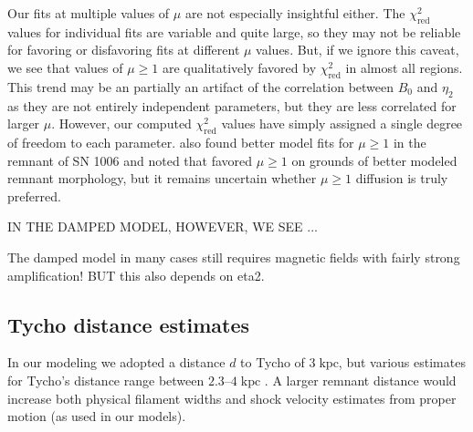 \documentclass[iop, apj, numberedappendix]{emulateapj}
\newcommand*{\mt}{\mathrm}
\newcommand*{\unit}[1]{\;\mt{#1}}  %
\begin{document}
Our fits at multiple values of $\mu$ are not especially insightful either.
The $\chi^2_{\mt{red}}$ values for individual fits are variable and quite
large, so they may not be reliable for favoring or disfavoring fits at
different $\mu$ values.  But, if we ignore this caveat, we see that values
of $\mu \geq 1$ are qualitatively favored by $\chi^2_{\mt{red}}$ in almost all
regions.  This trend may be an partially an artifact of the correlation between
$B_0$ and $\eta_2$ as they are not entirely independent parameters, but they
are less correlated for larger $\mu$.  However, our computed
$\chi^2_{\mt{red}}$ values have simply assigned a single degree of freedom to
each parameter.   also found better model fits for $\mu
\geq 1$ in the remnant of SN 1006 and noted that \citet{reynolds2004} favored
$\mu \geq 1$ on grounds of better modeled remnant morphology, but it remains
uncertain whether $\mu \geq 1$ diffusion is truly preferred.


IN THE DAMPED MODEL, HOWEVER, WE SEE ...

The damped model in many cases still requires magnetic fields with fairly
strong amplification!
BUT this also depends on eta2.

\subsection{Tycho distance estimates}


In our modeling we adopted a distance $d$ to Tycho of $3 \unit{kpc}$, but
various estimates for Tycho's distance range between $2.3$--$4 \unit{kpc}$
\citep{hayato2010}.  A larger remnant distance would increase both physical
filament widths and shock velocity estimates from proper motion (as used in our
models).
\end{document}
